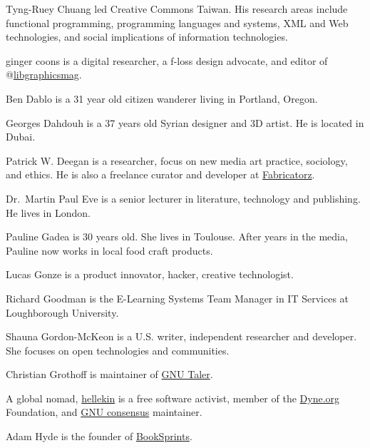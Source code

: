 \protect\hypertarget{tyng-ruey-chuang}{}{}Tyng-Ruey Chuang led Creative
Commons Taiwan. His research areas include functional programming,
programming languages and systems, XML and Web technologies, and social
implications of information technologies.

\protect\hypertarget{ginger-coons}{}{}ginger coons is a digital
researcher, a f-loss design advocate, and editor of
@\href{https://twitter.com/libgraphicsmag}{libgraphicsmag}.

\protect\hypertarget{ben-dablo}{}{}Ben Dablo is a 31 year old citizen
wanderer living in Portland, Oregon.

\protect\hypertarget{georges-dahdouh}{}{}Georges Dahdouh is a 37 years
old Syrian designer and 3D artist. He is located in Dubai.

\protect\hypertarget{patrick-w-deegan}{}{}Patrick W. Deegan is a
researcher, focus on new media art practice, sociology, and ethics. He
is also a freelance curator and developer at
\href{https://fabricatorz.com/}{Fabricatorz}.

\protect\hypertarget{martin-paul-eve}{}{}Dr.~Martin Paul Eve is a senior
lecturer in literature, technology and publishing. He lives in London.

\protect\hypertarget{pauline-gadea}{}{}Pauline Gadea is 30 years old.
She lives in Toulouse. After years in the media, Pauline now works in
local food craft products.

\protect\hypertarget{lucas-gonze}{}{}Lucas Gonze is a product innovator,
hacker, creative technologist.

\protect\hypertarget{richard-goodman}{}{}Richard Goodman is the
E-Learning Systems Team Manager in IT Services at Loughborough
University.

\protect\hypertarget{shauna-gordon-mckeon}{}{}Shauna Gordon-McKeon is a
U.S. writer, independent researcher and developer. She focuses on open
technologies and communities.

\protect\hypertarget{christian-grothoff}{}{}Christian Grothoff is
maintainer of \href{https://taler.net}{GNU Taler}.

\protect\hypertarget{hellekin}{}{}A global nomad,
\href{https://twitter.com/hellekin}{hellekin} is a free software
activist, member of the \href{https://dyne.org}{Dyne.org} Foundation,
and \href{https://gnu.org/consensus}{GNU consensus} maintainer.

\protect\hypertarget{adam-hyde}{}{}Adam Hyde is the founder of
\href{http://booksprints.net}{BookSprints}.


